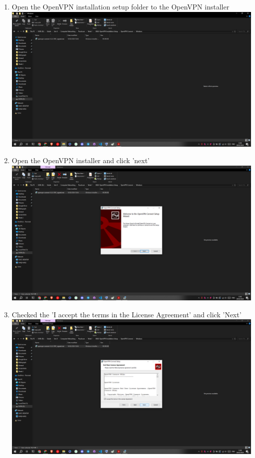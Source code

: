 \documentclass[12pt,titlepage]{article}
\begin{document}
\begin{enumerate}
    \item Open the OpenVPN installation setup folder to the OpenVPN installer \\ \includegraphics[width=.9\textwidth]{images/figures/Screenshot (443).png}
    \item Open the OpenVPN installer and click 'next' \\ \includegraphics[width=.9\textwidth]{images/figures/Screenshot (444).png}
    \newpage
    \item Checked the 'I accept the terms in the License Agreement' and click 'Next' \\ \includegraphics[width=.9\textwidth]{images/figures/Screenshot (445).png}

\end{enumerate}
\end{document}

